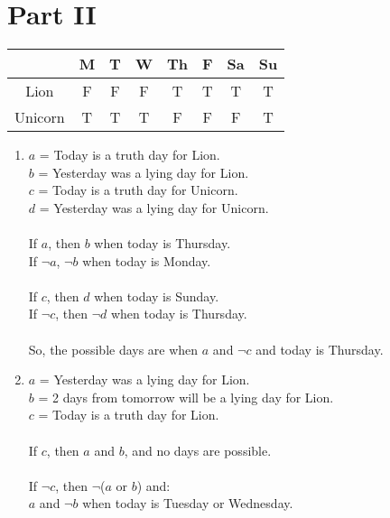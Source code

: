 \documentclass{article}
\begin{document}
\pagebreak

\section*{Part II}

\begin{center}
\begin{tabular}{c|c|c|c|c|c|c|c}
 & M & T & W & Th & F & Sa & Su \\
\hline
Lion & F & F & F & T & T & T & T \\
\hline
Unicorn & T & T & T & F & F & F & T \\

\end{tabular}
\end{center}
\begin{enumerate}[1.]
    \item 
        $a$ = Today is a truth day for Lion. \\
        $b$ = Yesterday was a lying day for Lion. \\
        $c$ = Today is a truth day for Unicorn. \\
        $d$ = Yesterday was a lying day for Unicorn. \\
        \\
        If $a$, then $b$ when today is Thursday. \\
        If $\neg$$a$, $\neg$$b$ when today is Monday. \\
        \\
        If $c$, then $d$ when today is Sunday. \\
        If $\neg$$c$, then $\neg$$d$ when today is Thursday. \\
        \\
        So, the possible days are when $a$ and $\neg$$c$ and today is Thursday.
    \item
        $a$ = Yesterday was a lying day for Lion. \\
        $b$ = 2 days from tomorrow will be a lying day for Lion. \\
        $c$ = Today is a truth day for Lion. \\ 
        \\
        If $c$, then $a$ and $b$, and no days are possible. \\
        \\
        If $\neg$$c$, then $\neg$($a$ or $b$) and: \\
            $a$ and $\neg$$b$ when today is Tuesday or Wednesday. \\
$$
\end{enumerate}
\end{document}
